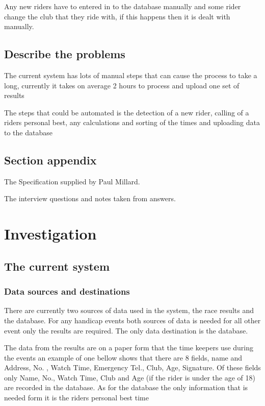 Any new riders have to entered in to the database manually and some rider change the club that they ride with, if this happens then it is dealt with manually.
\subsection{Describe the problems}
The current system has lots of manual steps that can cause the process to take a long, currently it takes on average 2 hours to process and upload one set of results

The steps that could be automated is the detection of a new rider, calling of a riders personal best, any calculations and sorting of the times and uploading data to the database
\subsection{Section appendix}

The Specification supplied by Paul Millard.


The interview questions and notes taken from answers.






\section{Investigation}

\subsection{The current system}

\subsubsection{Data sources and destinations}
There are currently two sources of data used in the system, the race results and the database. For any handicap events both sources of data is needed for all other event only the results are required. The only data destination is the database.

The data from the results are on a paper form that the time keepers use during the events an example of one bellow shows that there are 8 fields, name and Address, No. , Watch Time, Emergency Tel., Club, Age, Signature. Of these fields only Name, No., Watch Time, Club and Age (if the rider is under the age of 18) are recorded in the database. As for the database the only information that is needed form it is the riders personal best time

